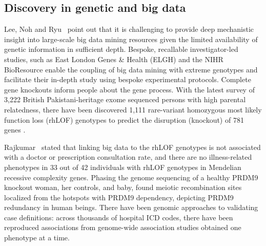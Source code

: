 \subsection{Discovery in genetic and big data}
Lee, Noh and Ryu~\cite{lee2011ire1} point out that it is challenging
to provide deep mechanistic insight into large-scale big data mining
resources given the limited availability of genetic information in
sufficient depth. 
Bespoke, recallable investigator-led studies, such as East London
Genes \& Health (ELGH) and the NIHR BioResource enable the  coupling
of big data mining with extreme genotypes and facilitate  their
in-depth study using bespoke experimental protocols. 
Complete gene knockouts inform people about the gene process. 
With the latest survey of 3,222 British Pakistani-heritage exome
sequenced persons with high parental relatedness, there have  been
discovered 1,111 rare-variant homozygous most likely  function loss
(rhLOF) genotypes to predict the disruption (knockout) of  781 genes
\cite{wang2005framingham}. 
\par Rajkumar~\cite{rajkumar2010diagnosis} stated that linking big
data to the rhLOF genotypes is not associated with a doctor or
prescription consultation rate, and there are no illness-related
phenotypes in 33 out of 42 individuals with rhLOF genotypes in
Mendelian recessive complexity genes. Phasing the genome sequencing of
a healthy PRDM9 knockout woman, her controls, and baby, found meiotic
recombination sites localized from the hotspots with PRDM9 dependency,
depicting PRDM9 redundancy in human beings. There have been genomic
approaches to validating case definitions: across thousands of
hospital ICD codes, there have been reproduced associations from
genome-wide association studies obtained one phenotype at a time.

